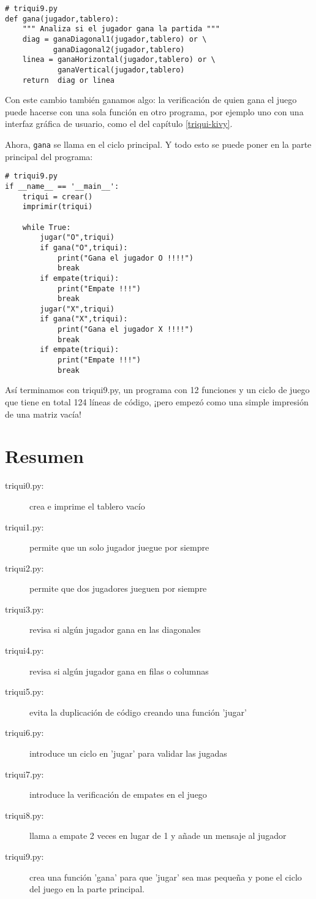 \begin{lstlisting}
# triqui9.py
def gana(jugador,tablero):
    """ Analiza si el jugador gana la partida """
    diag = ganaDiagonal1(jugador,tablero) or \
           ganaDiagonal2(jugador,tablero)
    linea = ganaHorizontal(jugador,tablero) or \
            ganaVertical(jugador,tablero)
    return  diag or linea
\end{lstlisting}
Con este cambio también ganamos algo: la verificación de quien gana
el juego puede hacerse con una sola función en otro programa, por
ejemplo uno con una interfaz gráfica de usuario, como el del capítulo
\ref{triqui-kivy}.

Ahora, \texttt{gana} se llama en el ciclo principal. Y todo esto se
puede poner en la parte principal del programa:

\begin{lstlisting}
# triqui9.py
if __name__ == '__main__':
    triqui = crear()
    imprimir(triqui)

    while True:
        jugar("O",triqui)
        if gana("O",triqui):
            print("Gana el jugador O !!!!")
            break
        if empate(triqui):
            print("Empate !!!")
            break
        jugar("X",triqui)
        if gana("X",triqui):
            print("Gana el jugador X !!!!")
            break
        if empate(triqui):
            print("Empate !!!")
            break
\end{lstlisting}
Así terminamos con triqui9.py, un programa con 12 funciones y un ciclo
de juego que tiene en total 124 líneas de código, ¡pero empezó como
una simple impresión de una matriz vacía!

\section{Resumen}
\begin{description}
\item [{triqui0.py:}] crea e imprime el tablero vacío 
\item [{triqui1.py:}] permite que un solo jugador juegue por siempre 
\item [{triqui2.py:}] permite que dos jugadores jueguen por siempre 
\item [{triqui3.py:}] revisa si algún jugador gana en las diagonales 
\item [{triqui4.py:}] revisa si algún jugador gana en filas o columnas 
\item [{triqui5.py:}] evita la duplicación de código creando una función
'jugar' 
\item [{triqui6.py:}] introduce un ciclo en 'jugar' para validar las jugadas 
\item [{triqui7.py:}] introduce la verificación de empates en el juego 
\item [{triqui8.py:}] llama a empate 2 veces en lugar de 1 y añade un mensaje
al jugador 
\item [{triqui9.py:}] crea una función 'gana' para que 'jugar' sea mas
pequeña y pone el ciclo del juego en la parte principal. 
\end{description}


